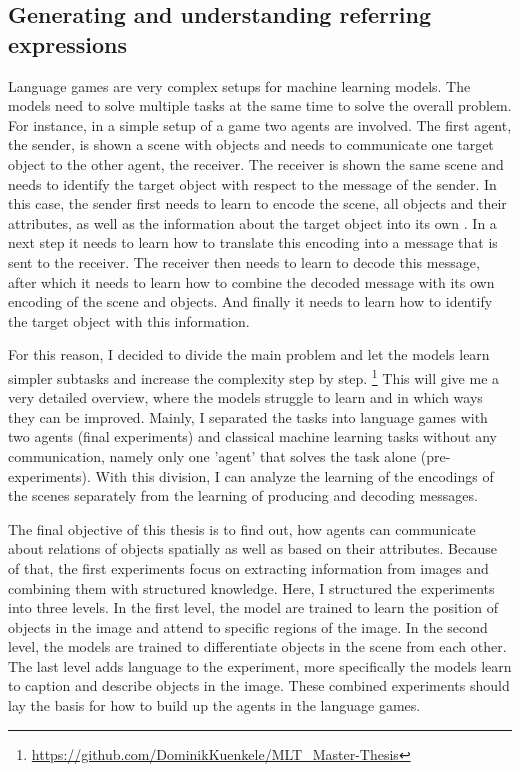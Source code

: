 
\subsection{Generating and understanding referring expressions}
Language games are very complex setups for machine learning models.
The models need to solve multiple tasks at the same time to solve the overall problem.
For instance, in a simple setup of a game two agents are involved.
The first agent, the sender, is shown a scene with objects and needs to communicate one target object to the other agent, the receiver.
The receiver is shown the same scene and needs to identify the target object with respect to the message of the sender.
In this case, the sender first needs to learn to encode the scene, all objects and their attributes, as well as the information about the target object into its own .
In a next step it needs to learn how to translate this encoding into a message that is sent to the receiver.
The receiver then needs to learn to decode this message, after which it needs to learn how to combine the decoded message with its own encoding of the scene and objects.
And finally it needs to learn how to identify the target object with this information.

For this reason, I decided to divide the main problem and let the models learn simpler subtasks and increase the complexity step by step.
\footnote{\href{https://github.com/DominikKuenkele/MLT\_Master-Thesis}{https://github.com/DominikKuenkele/MLT\_Master-Thesis}}
This will give me a very detailed overview, where the models struggle to learn and in which ways they can be improved.
Mainly, I separated the tasks into language games with two agents (final experiments) and classical machine learning tasks without any communication, namely only one 'agent' that solves the task alone (pre-experiments).
With this division, I can analyze the learning of the encodings of the scenes separately from the learning of producing and decoding messages.

The final objective of this thesis is to find out, how agents can communicate about relations of objects spatially as well as based on their attributes.
Because of that, the first experiments focus on extracting information from images and combining them with structured knowledge.
Here, I structured the experiments into three levels.
In the first level, the model are trained to learn the position of objects in the image and attend to specific regions of the image.
In the second level, the models are trained to differentiate objects in the scene from each other.
The last level adds language to the experiment, more specifically the models learn to caption and describe objects in the image.
These combined experiments should lay the basis for how to build up the agents in the language games.

